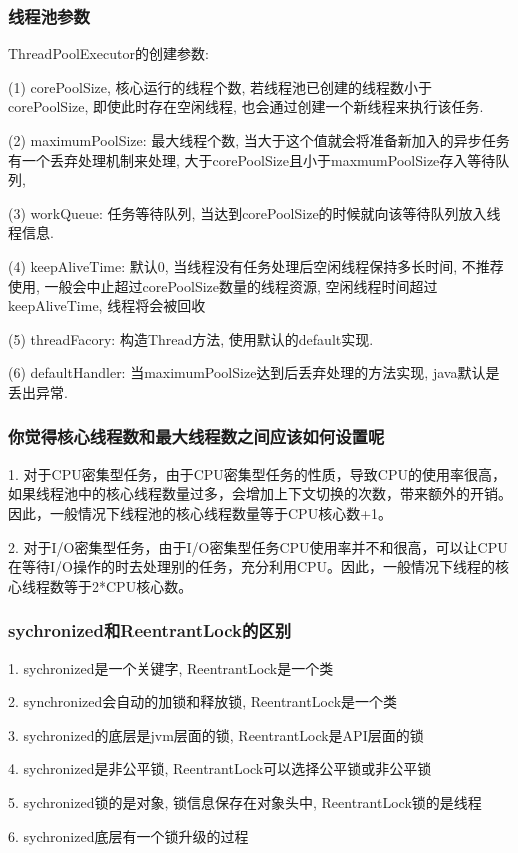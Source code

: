 \documentclass[UTF8]{ctexart}
\begin{document}
\subsubsection{线程池参数}
ThreadPoolExecutor的创建参数: \par
(1) corePoolSize, 核心运行的线程个数, 若线程池已创建的线程数小于corePoolSize, 即使此时存在空闲线程, 也会通过创建一个新线程来执行该任务. \par
(2) maximumPoolSize: 最大线程个数, 当大于这个值就会将准备新加入的异步任务有一个丢弃处理机制来处理, 大于corePoolSize且小于maxmumPoolSize存入等待队列,\par
(3) workQueue: 任务等待队列, 当达到corePoolSize的时候就向该等待队列放入线程信息.\par
(4) keepAliveTime: 默认0, 当线程没有任务处理后空闲线程保持多长时间, 不推荐使用, 一般会中止超过corePoolSize数量的线程资源, 空闲线程时间超过keepAliveTime, 线程将会被回收 \par
(5) threadFacory: 构造Thread方法, 使用默认的default实现. \par
(6) defaultHandler: 当maximumPoolSize达到后丢弃处理的方法实现, java默认是丢出异常. \par

\subsubsection{你觉得核心线程数和最大线程数之间应该如何设置呢}
1. 对于CPU密集型任务，由于CPU密集型任务的性质，导致CPU的使用率很高，如果线程池中的核心线程数量过多，会增加上下文切换的次数，带来额外的开销。因此，一般情况下线程池的核心线程数量等于CPU核心数+1。

2. 对于I/O密集型任务，由于I/O密集型任务CPU使用率并不和很高，可以让CPU在等待I/O操作的时去处理别的任务，充分利用CPU。因此，一般情况下线程的核心线程数等于2*CPU核心数。


\subsubsection{sychronized和ReentrantLock的区别}
1. sychronized是一个关键字, ReentrantLock是一个类 \par
2. synchronized会自动的加锁和释放锁, ReentrantLock是一个类 \par
3. sychronized的底层是jvm层面的锁, ReentrantLock是API层面的锁 \par
4. sychronized是非公平锁, ReentrantLock可以选择公平锁或非公平锁 \par
5. sychronized锁的是对象, 锁信息保存在对象头中, ReentrantLock锁的是线程 \par
6. sychronized底层有一个锁升级的过程 \par
\end{document}
